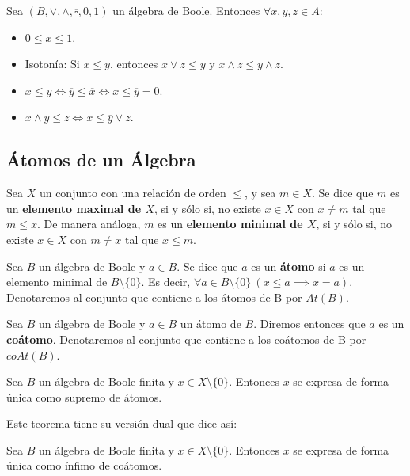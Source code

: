 \smallskip
\begin{properties}
    Sea $(B, \lor, \land, \overline{\square}, 0, 1)$ un álgebra de Boole. Entonces $\forall x,y,z \in A$:
    \begin{itemize}
        \item $0 \leq x \leq 1$.
        \item Isotonía: Si $x \leq y$, entonces $x \lor z \leq y$ y $x \land z \leq y \land z$.
        \item $x\leq y \Longleftrightarrow \overline{y} \leq \overline{x} \Longleftrightarrow x \leq \overline{y} = 0$.
        \item $x \land y \leq z \Longleftrightarrow x \leq \overline{y} \lor z$.
    \end{itemize}
\end{properties}

\subsection{Átomos de un Álgebra}
\begin{ndef}
    Sea $X$ un conjunto con una relación de orden $\leq$, y sea $m \in X$. Se dice que $m$ es un \textbf{elemento maximal de $X$}, si y sólo si, no existe $x \in X$ con $x \neq m$ tal que $m \leq x$.
    De manera análoga, $m$ es un \textbf{elemento minimal de $X$}, si y sólo si, no existe $x \in X$ con $m \neq x$ tal que $x \leq m$.
\end{ndef}
\begin{ndef}[Átomo]
    Sea $B$ un álgebra de Boole y $a \in B$. Se dice que $a$ es un \textbf{átomo} si $a$ es un elemento minimal de $B \setminus \{0\}$. Es decir,
    $\forall a \in B \setminus \{0\} \ (x \leq a \implies x = a)$. Denotaremos al conjunto que contiene a los átomos de B por $At(B)$.
\end{ndef}
\begin{ndef}[Coátomo]
    Sea $B$ un álgebra de Boole y $a \in B$ un átomo de $B$. Diremos entonces que $\overline{a}$ es un \textbf{coátomo}.
    Denotaremos al conjunto que contiene a los coátomos de B por $coAt(B)$.
\end{ndef}

\begin{nth}
    Sea $B$ un álgebra de Boole finita y $x \in X \setminus \{0\}$. Entonces $x$ se expresa de forma única como supremo de átomos.
\end{nth}
Este teorema tiene su versión dual que dice así:
\begin{nth}
    Sea $B$ un álgebra de Boole finita y $x \in X \setminus \{0\}$. Entonces $x$ se expresa de forma única como ínfimo de coátomos.
\end{nth}

